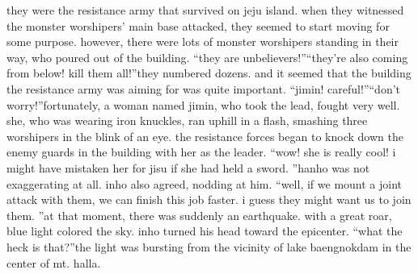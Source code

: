  they were the resistance army that survived on jeju island.
when they witnessed the monster worshipers’ main base attacked, they seemed to start moving for some purpose.
 however, there were lots of monster worshipers standing in their way, who poured out of the building.
“they are unbelievers!”“they’re also coming from below! kill them all!”they numbered dozens.
 and it seemed that the building the resistance army was aiming for was quite important.
“jimin! careful!”“don’t worry!”fortunately, a woman named jimin, who took the lead, fought very well.
 she, who was wearing iron knuckles, ran uphill in a flash, smashing three worshipers in the blink of an eye.
the resistance forces began to knock down the enemy guards in the building with her as the leader.
“wow! she is really cool! i might have mistaken her for jisu if she had held a sword.
”hanho was not exaggerating at all.
 inho also agreed, nodding at him.
“well, if we mount a joint attack with them, we can finish this job faster.
 i guess they might want us to join them.
”at that moment, there was suddenly an earthquake.
 with a great roar, blue light colored the sky.
 inho turned his head toward the epicenter.
“what the heck is that?”the light was bursting from the vicinity of lake baengnokdam in the center of mt.
 halla.

